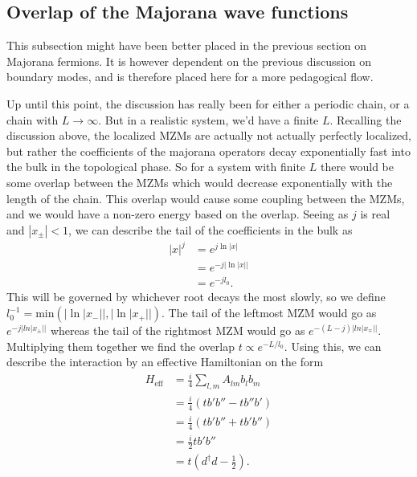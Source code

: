 \subsection{Overlap of the Majorana wave functions} \label{subsec:_Overlap_Of_MFs}
This subsection might have been better placed in the previous section on Majorana fermions. It is however dependent on the previous discussion on boundary modes, and is therefore placed here for a more pedagogical flow. 

Up until this point, the discussion has really been for either a periodic chain, or a chain with $L \to \infty$. But in a realistic system, we'd have a finite $L$. Recalling the discussion above, the localized MZMs are actually not actually perfectly localized, but rather the coefficients of the majorana operators decay exponentially fast into the bulk in the topological phase. So for a system with finite $L$ there would be some overlap between the MZMs which would decrease exponentially with the length of the chain. This overlap would cause some coupling between the MZMs, and we would have a non-zero energy based on the overlap. Seeing as $j$ is real and $|x_\pm| < 1$, we can describe the tail of the coefficients in the bulk as 
\begin{align}
    |x|^j &= e^{j \ln|x|} \\
    &= e^{-j |\ln|x||} \\
    &= e^{-j l_0}.
\end{align}
This will be governed by whichever root decays the most slowly, so we define $l_0^{-1} = \text{min}(|\ln|x_-||, |\ln|x_+||)$. The tail of the leftmost MZM would go as $e^{-j |ln|x_\pm||}$ whereas the tail of the rightmost MZM would go as $e^{-(L-j) |ln|x_\mp||}$. Multiplying them together we find the overlap $t \propto e^{-L/l_0}$. Using this, we can describe the interaction by an effective Hamiltonian on the form 
\begin{align}
    H_\text{eff} &= \frac{i}{4} \sum_{l, m} A_{lm} b_l b_m\\
    &= \frac{i}{4}\left(t b' b'' - t b'' b' \right)\\
    &= \frac{i}{4}\left(t b' b'' + t b' b'' \right)\\
    &= \frac{i}{2} t b' b'' \\
    &= t (d^\dagger d - \frac{1}{2}).
\end{align}
